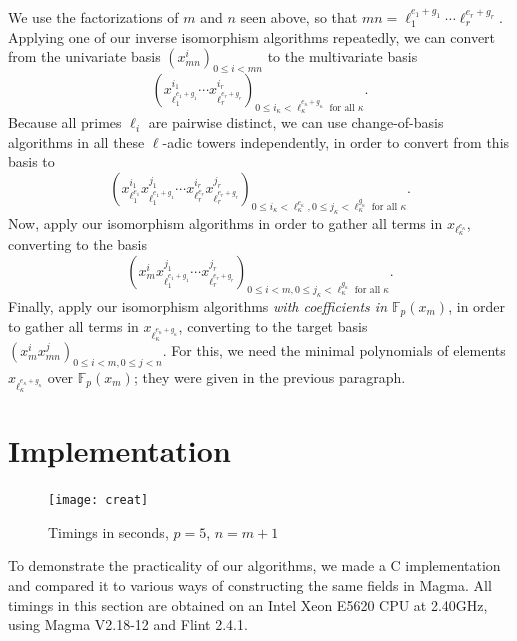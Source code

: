 \documentclass{sig-alternate}
\def\F {\ensuremath{\mathbb{F}}}
\newcounter{algo}
\begin{document}
We use the factorizations of $m$ and $n$ seen above, so that $mn =
\ell_1^{e_1+g_1} \cdots \ell_r^{e_r + g_r}$. Applying one of our
inverse isomorphism algorithms repeatedly, we can convert
from the univariate basis $(x_{mn}^i)_{0 \le i < mn}$ to
the multivariate basis 
$$(x^{i_1}_{\ell_1^{e_1+g_1}}\cdots x^{i_r}_{\ell_r^{e_r+g_r}})_{ 0\le i_\kappa < \ell_\kappa^{e_\kappa+g_\kappa}  \text{~for all $\kappa$}}.$$
Because all primes $\ell_i$ are pairwise distinct, we can use 
change-of-basis algorithms in all these $\ell$-adic towers independently, in
order to convert from this basis to
$$(x^{i_1}_{\ell_1^{e_1}} x^{j_1}_{\ell_1^{e_1+g_1}} 
\cdots x^{i_r}_{\ell_r^{e_r}} x^{j_r}_{\ell_r^{e_r+g_r}})_{ 
  0\le i_\kappa < \ell_\kappa^{e_\kappa},   0\le j_\kappa < \ell_\kappa^{g_\kappa} \text{~for all $\kappa$}}.$$
Now, apply our isomorphism algorithms in order to
gather all terms in $x_{\ell_\kappa^{e_\kappa}}$, converting
to the basis
$$(x_m^i x^{j_1}_{\ell_1^{e_1+g_1}} \cdots
x^{j_r}_{\ell_r^{e_r+g_r}})_{ 0\le i < m, 0\le j_\kappa <
  \ell_\kappa^{g_\kappa} \text{~for all $\kappa$}}.$$ Finally, apply
our isomorphism algorithms {\em with coefficients in $\F_p(x_m)$}, in
order to gather all terms in $x_{\ell_\kappa^{e_\kappa+g_\kappa}}$,
converting to the target basis $(x_m^i x_{mn}^j)_{0 \le i < m, 0 \le j
  < n}$.  For this, we need the minimal polynomials of elements
$x_{\ell_\kappa^{e_\kappa+g_\kappa}}$ over $\F_p(x_m)$;
they were given in the previous paragraph.



\section{Implementation}\label{sec:implem}

\begin{figure}
  \centering
  \texttt{[image: creat]}
  \caption{Timings in seconds, $p=5$, $n=m+1$}
  \label{fig:bench}
\vspace{-4ex}
\end{figure}

To demonstrate the practicality of our algorithms, we made a C
implementation and compared it to various ways of constructing the
same fields in Magma. All timings in this section are obtained on an
Intel Xeon E5620 CPU at 2.40GHz, using Magma V2.18-12 and Flint 2.4.1.
\end{document}
